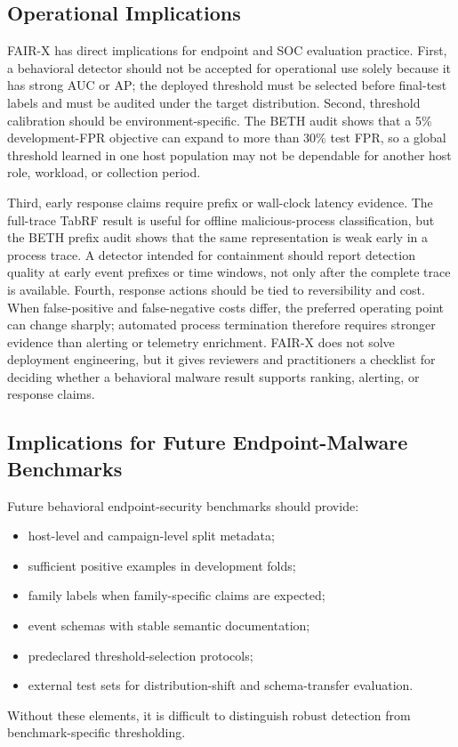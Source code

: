 \documentclass[10pt,journal,compsoc]{IEEEtran}
\begin{document}
\subsection{Operational Implications}

FAIR-X has direct implications for endpoint and SOC evaluation practice. First, a behavioral detector should not be accepted for operational use solely because it has strong AUC or AP; the deployed threshold must be selected before final-test labels and must be audited under the target distribution. Second, threshold calibration should be environment-specific. The BETH audit shows that a 5\% development-FPR objective can expand to more than 30\% test FPR, so a global threshold learned in one host population may not be dependable for another host role, workload, or collection period.

Third, early response claims require prefix or wall-clock latency evidence. The full-trace TabRF result is useful for offline malicious-process classification, but the BETH prefix audit shows that the same representation is weak early in a process trace. A detector intended for containment should report detection quality at early event prefixes or time windows, not only after the complete trace is available. Fourth, response actions should be tied to reversibility and cost. When false-positive and false-negative costs differ, the preferred operating point can change sharply; automated process termination therefore requires stronger evidence than alerting or telemetry enrichment. FAIR-X does not solve deployment engineering, but it gives reviewers and practitioners a checklist for deciding whether a behavioral malware result supports ranking, alerting, or response claims.

\subsection{Implications for Future Endpoint-Malware Benchmarks}

Future behavioral endpoint-security benchmarks should provide:
\begin{itemize}
    \item host-level and campaign-level split metadata;
    \item sufficient positive examples in development folds;
    \item family labels when family-specific claims are expected;
    \item event schemas with stable semantic documentation;
    \item predeclared threshold-selection protocols;
    \item external test sets for distribution-shift and schema-transfer evaluation.
\end{itemize}
Without these elements, it is difficult to distinguish robust detection from benchmark-specific thresholding.
\end{document}
